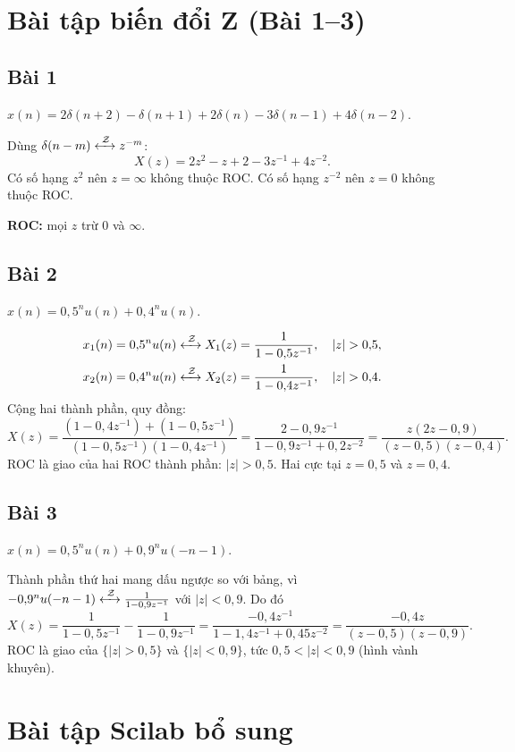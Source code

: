 \documentclass[12pt,a4paper]{article}
\newcommand{\Z}{\xleftrightarrow{\;\mathcal{Z}\;}}
\begin{document}
\section{Bài tập biến đổi Z (Bài 1--3)}

\subsection{Bài 1}
$x(n)=2\delta(n+2)-\delta(n+1)+2\delta(n)-3\delta(n-1)+4\delta(n-2)$.

Dùng $\delta(n-m)\Z z^{-m}$:
\[
X(z)=2z^{2}-z+2-3z^{-1}+4z^{-2}.
\]
Có số hạng $z^{2}$ nên $z=\infty$ không thuộc ROC. Có số hạng $z^{-2}$ nên $z=0$ không thuộc ROC.

\textbf{ROC:} mọi $z$ trừ $0$ và $\infty$.

\subsection{Bài 2}
$x(n)=0{,}5^n u(n)+0{,}4^n u(n)$.

\begin{align*}
x_1(n)=0{,}5^n u(n)&\Z X_1(z)=\frac{1}{1-0{,}5z^{-1}},\quad |z|>0{,}5,\\
x_2(n)=0{,}4^n u(n)&\Z X_2(z)=\frac{1}{1-0{,}4z^{-1}},\quad |z|>0{,}4.
\end{align*}
Cộng hai thành phần, quy đồng:
\[
X(z)=\frac{(1-0{,}4z^{-1})+(1-0{,}5z^{-1})}{(1-0{,}5z^{-1})(1-0{,}4z^{-1})}
=\frac{2-0{,}9z^{-1}}{1-0{,}9z^{-1}+0{,}2z^{-2}}
=\frac{z(2z-0{,}9)}{(z-0{,}5)(z-0{,}4)}.
\]
ROC là giao của hai ROC thành phần: \textbf{$|z|>0{,}5$}. Hai cực tại $z=0{,}5$ và $z=0{,}4$.

\subsection{Bài 3}
$x(n)=0{,}5^n u(n)+0{,}9^n u(-n-1)$.

Thành phần thứ hai mang dấu ngược so với bảng, vì $-0{,}9^n u(-n-1)\Z \frac{1}{1-0{,}9z^{-1}}$ với $|z|<0{,}9$. Do đó
\[
X(z)=\frac{1}{1-0{,}5z^{-1}}-\frac{1}{1-0{,}9z^{-1}}
=\frac{-0{,}4z^{-1}}{1-1{,}4z^{-1}+0{,}45z^{-2}}
=\frac{-0{,}4z}{(z-0{,}5)(z-0{,}9)}.
\]
ROC là giao của $\{|z|>0{,}5\}$ và $\{|z|<0{,}9\}$, tức \textbf{$0{,}5<|z|<0{,}9$} (hình vành khuyên).

\section{Bài tập Scilab bổ sung}
\end{document}
